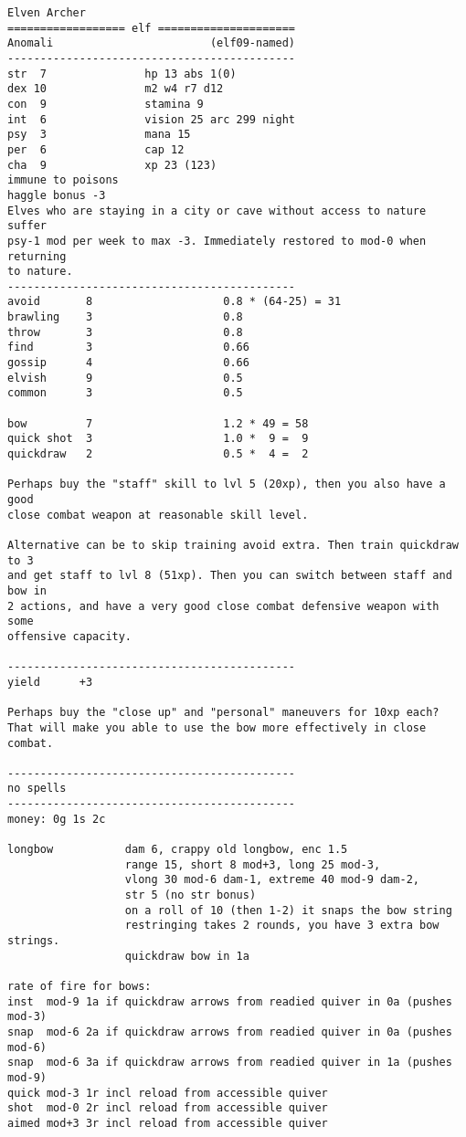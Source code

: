 \goodbreak
\tiny \begin{samepage} \begin{verbatim}
Elven Archer
================== elf =====================
Anomali                        (elf09-named)
--------------------------------------------
str  7               hp 13 abs 1(0)
dex 10               m2 w4 r7 d12
con  9               stamina 9
int  6               vision 25 arc 299 night
psy  3               mana 15
per  6               cap 12
cha  9               xp 23 (123)
immune to poisons
haggle bonus -3
Elves who are staying in a city or cave without access to nature suffer
psy-1 mod per week to max -3. Immediately restored to mod-0 when returning
to nature.
--------------------------------------------
avoid       8                    0.8 * (64-25) = 31
brawling    3                    0.8
throw       3                    0.8
find        3                    0.66
gossip      4                    0.66
elvish      9                    0.5
common      3                    0.5

bow         7                    1.2 * 49 = 58
quick shot  3                    1.0 *  9 =  9
quickdraw   2                    0.5 *  4 =  2

Perhaps buy the "staff" skill to lvl 5 (20xp), then you also have a good
close combat weapon at reasonable skill level.

Alternative can be to skip training avoid extra. Then train quickdraw to 3
and get staff to lvl 8 (51xp). Then you can switch between staff and bow in
2 actions, and have a very good close combat defensive weapon with some
offensive capacity.

--------------------------------------------
yield      +3

Perhaps buy the "close up" and "personal" maneuvers for 10xp each?
That will make you able to use the bow more effectively in close combat.

--------------------------------------------
no spells
--------------------------------------------
money: 0g 1s 2c

longbow           dam 6, crappy old longbow, enc 1.5
                  range 15, short 8 mod+3, long 25 mod-3,
                  vlong 30 mod-6 dam-1, extreme 40 mod-9 dam-2,
                  str 5 (no str bonus)
                  on a roll of 10 (then 1-2) it snaps the bow string
                  restringing takes 2 rounds, you have 3 extra bow strings.
                  quickdraw bow in 1a

rate of fire for bows:
inst  mod-9 1a if quickdraw arrows from readied quiver in 0a (pushes mod-3)
snap  mod-6 2a if quickdraw arrows from readied quiver in 0a (pushes mod-6)
snap  mod-6 3a if quickdraw arrows from readied quiver in 1a (pushes mod-9)
quick mod-3 1r incl reload from accessible quiver
shot  mod-0 2r incl reload from accessible quiver
aimed mod+3 3r incl reload from accessible quiver


\end{verbatim}
\end{samepage}
